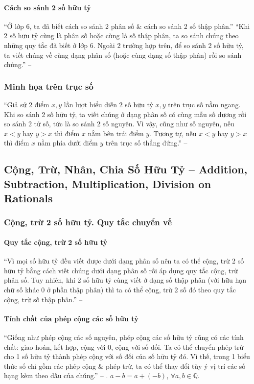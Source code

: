\documentclass{article}
\numberwithin{equation}{section}
\begin{document}
\paragraph{Cách so sánh 2 số hữu tỷ}
``Ở lớp 6, ta đã biết cách so sánh 2 phân số \& cách so sánh 2 số thập phân.'' ``Khi 2 số hữu tỷ cùng là phân số hoặc cùng là số thập phân, ta so sánh chúng theo những quy tắc đã biết ở lớp 6. Ngoài 2 trường hợp trên, để so sánh 2 số hữu tỷ, ta viết chúng về cùng dạng phân số (hoặc cùng dạng số thập phân) rồi so sánh chúng.'' -- \cite[p. 9]{SGK_Toan_7_Canh_Dieu_tap_1}

\subsubsection{Minh họa trên trục số}
``Giả sử 2 điểm $x,y$ lần lượt biểu diễn 2 số hữu tỷ $x,y$ trên trục số nằm ngang. Khi so sánh 2 số hữu tỷ, ta viết chúng ở dạng phân số có cùng mẫu số dương rồi so sánh 2 tử số, tức là so sánh 2 số nguyên. Vì vậy, cũng như số nguyên, nếu $x < y$ hay $y > x$ thì điểm $x$ nằm bên trái điểm $y$. Tương tự, nếu $x < y$ hay $y > x$ thì điểm $x$ nằm phía dưới điểm $y$ trên trục số thẳng đứng.'' -- \cite[pp. 9--10]{SGK_Toan_7_Canh_Dieu_tap_1}

\subsection{Cộng, Trừ, Nhân, Chia Số Hữu Tỷ -- Addition, Subtraction, Multiplication, Division on Rationals}

\subsubsection{Cộng, trừ 2 số hữu tỷ. Quy tắc chuyển vế}

\paragraph{Quy tắc cộng, trừ 2 số hữu tỷ}
``Vì mọi số hữu tỷ đều viết được dưới dạng phân số nên ta có thể cộng, trừ 2 số hữu tỷ bằng cách viết chúng dưới dạng phân số rồi áp dụng quy tắc cộng, trừ phân số. Tuy nhiên, khi 2 số hữu tỷ cùng viết ở dạng số thập phân (với hữu hạn chữ số khác $0$ ở phần thập phân) thì ta có thể cộng, trừ 2 số đó theo quy tắc cộng, trừ số thập phân.'' -- \cite[p. 12]{SGK_Toan_7_Canh_Dieu_tap_1}

\paragraph{Tính chất của phép cộng các số hữu tỷ}
``Giống như phép cộng các số nguyên, phép cộng các số hữu tỷ cũng có các tính chất: giao hoán, kết hợp, cộng với $0$, cộng với số đối. Ta có thể chuyển phép trừ cho 1 số hữu tỷ thành phép cộng với số đối của số hữu tỷ đó. Vì thế, trong 1 biểu thức số chỉ gồm các phép cộng \& phép trừ, ta có thể thay đổi tùy ý vị trí các số hạng kèm theo dấu của chúng.'' -- \cite[p. 13]{SGK_Toan_7_Canh_Dieu_tap_1}. $a - b = a + (-b)$, $\forall a,b\in\mathbb{Q}$.
\end{document}
